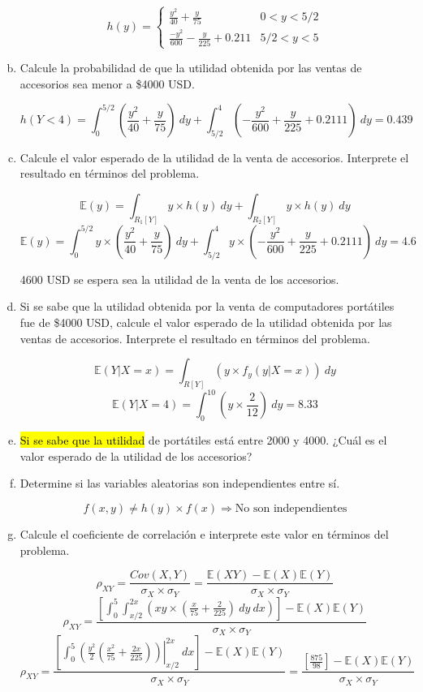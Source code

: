 \documentclass[../main.tex]{subfiles}
\begin{document}
\begin{enumerate}[(a)]
\[ h(y) = \begin{cases} 
      \frac{y^2}{40} + \frac{y}{75} & 0 < y < 5/2 \\
      \frac{-y^2}{600} - \frac{y}{225} + 0.211 & 5/2 < y < 5
   \end{cases}
\]

\item Calcule la probabilidad de que la utilidad obtenida por las ventas de
accesorios sea menor a \$4000 USD.

$$h(Y < 4) = \int_{0}^{5/2} \left( \frac{y^2}{40} + \frac{y}{75}\right) \ dy + \int_{5/2}^{4} \left( -\frac{y^2}{600} + \frac{y}{225} + 0.2111\right) \ dy = 0.439$$

\item Calcule el valor esperado de la utilidad de la venta de accesorios.
Interprete el resultado en términos del problema.

$$\mathbb{E}(y) = \int_{R_1[Y]} y \times h(y) \ dy + \int_{R_2[Y]} y \times h(y) \ dy$$
$$\mathbb{E}(y) = \int_{0}^{5/2} y \times \left( \frac{y^2}{40} + \frac{y}{75}\right) \ dy + \int_{5/2}^{4} y \times \left( -\frac{y^2}{600} + \frac{y}{225} + 0.2111\right) \ dy = 4.6$$

4600 USD se espera sea la utilidad de la venta de los accesorios.

\item Si se sabe que la utilidad obtenida por la venta de computadores
portátiles fue de \$4000 USD, calcule el valor esperado de la utilidad obtenida por
las ventas de accesorios. Interprete el resultado en términos del problema.

$$\mathbb{E}(Y | X = x) = \int_{R[Y]} \left( y \times f_{y}(y | X = x)\right) \ dy$$
$$\mathbb{E}(Y | X = 4) = \int_{0}^{10} \left( y \times \frac{2}{12}\right) \ dy = 8.33$$

\item \hl{Si se sabe que la utilidad} de portátiles está entre 2000 y 4000. ¿Cuál es
el valor esperado de la utilidad de los accesorios?

\item Determine si las variables aleatorias son independientes entre sí.

$$f(x, y) \neq h(y) \times f(x) \Rightarrow \text{No son independientes}$$

\item Calcule el coeficiente de correlación e interprete este valor en términos
del problema.

$$\rho_{XY} = \frac{Cov(X, Y)}{\sigma_{X} \times \sigma_{Y}} = \frac{\mathbb{E}(XY) - \mathbb{E}(X)\mathbb{E}(Y)}{\sigma_{X} \times \sigma_{Y}}$$
$$\rho_{XY} = \frac{\left[ \int_{0}^{5} \int_{x/2}^{2x} \left( xy \times \left( \frac{x}{75} + \frac{2}{225}\right) \ dy \ dx \right) \right] - \mathbb{E}(X)\mathbb{E}(Y)}{\sigma_{X} \times \sigma_{Y}}$$
$$\rho_{XY} = \frac{\left[ \int_{0}^{5}  \left.\left(\frac{y^2}{2}\left(\frac{x^2}{75} + \frac{2x}{225}\right)\right)\right\vert_{x/2}^{2x} \ dx  \right] - \mathbb{E}(X)\mathbb{E}(Y)}{\sigma_{X} \times \sigma_{Y}} = \frac{\left[ \frac{875}{98}  \right] - \mathbb{E}(X)\mathbb{E}(Y)}{\sigma_{X} \times \sigma_{Y}}$$


\end{enumerate}
\end{document}
